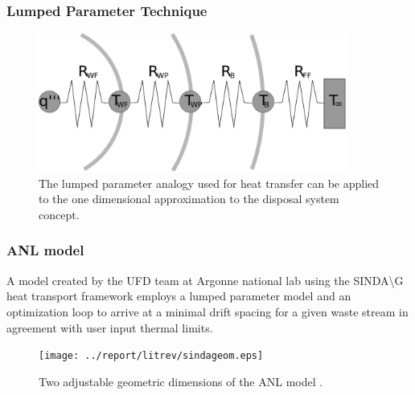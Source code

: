 \begin{frame}[ctb!]
  \frametitle{Lumped Parameter Technique}
  \begin{figure}[h!]
    \begin{center}
      \includegraphics[width=0.9\textwidth]{lumpedParam.eps}
    \end{center}
    \caption{The lumped parameter analogy used for heat transfer can be applied 
    to the one dimensional approximation to the disposal system concept. }
    \label{fig:lumpedParam}
  \end{figure}
  
\end{frame}



\begin{frame}
  \frametitle{ANL model}
  A model created by the UFD team at Argonne national lab using the 
  SINDA{\textbackslash}G heat transport framework employs a lumped parameter 
  model and an optimization loop to arrive at a minimal drift spacing for a 
  given waste stream in agreement with user input thermal limits. 
  \begin{figure}[h!]
    \begin{center}
      \texttt{[image: ../report/litrev/sindageom.eps]}
    \end{center}
    \caption{Two adjustable geometric dimensions of the ANL model 
    \cite{bauer_something_2010}.}
    \label{fig:sindageom}
  \end{figure}
\end{frame}


